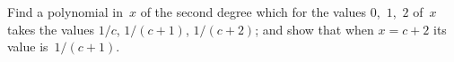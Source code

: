Find a polynomial in~$x$ of the second degree which for the values
$0$,~$1$,~$2$ of~$x$ takes the values $1/c$, $1/(c + 1)$, $1/(c + 2)$; and show that when
$x = c + 2$ its value is~$1/(c + 1)$. 

